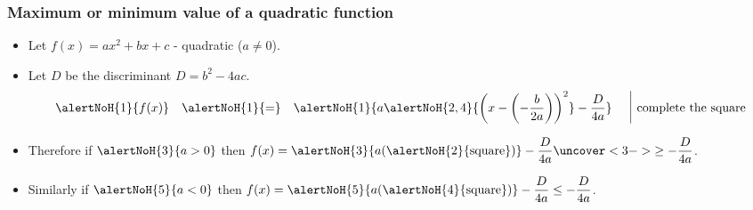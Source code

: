 \begin{frame}
\frametitle{Maximum or minimum value of a quadratic function}
\begin{itemize}
\item Let $f(x)=ax^2+bx+c$ - quadratic  ($a\neq 0$). 
\item Let $D$ be the discriminant $D=b^2-4ac$.
\[
\begin{array}{rcll|l}
\alertNoH{1}{f(x)}&\alertNoH{1}{=}&\displaystyle \alertNoH{1}{ a\alertNoH{2,4}{ \left(x-\left(-\frac{b}{2a}\right)\right)^2} -\frac{D }{4a} } & &\text{complete the square}\\
\end{array}
\]
\item<2-> Therefore if $\alertNoH{3}{a>0}$ then $\displaystyle f(x)=\alertNoH{3}{a ( \alertNoH{2}{\text{square}})}-\frac{D}{4a} \uncover<3->{\geq -\frac{D}{4a}}$.
\item<4-> Similarly if $\alertNoH{5}{a<0}$ then $\displaystyle f(x)=\alertNoH{5}{ a(\alertNoH{4}{ \text{square}})} -\frac{D}{4a}\leq -\frac{D}{4a}$.
\end{itemize}
\end{frame}
